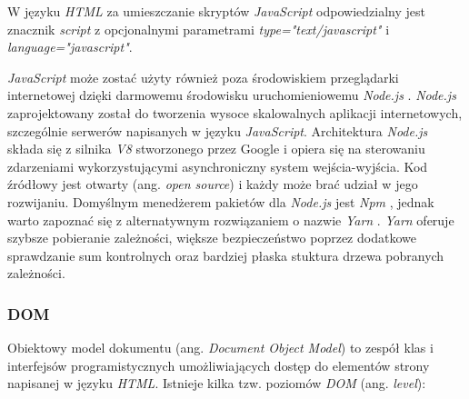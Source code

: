 \documentclass[polish, twoside, 12pt]{mwart}
\begin{document}
W języku \emph{HTML} za umieszczanie skryptów \emph{JavaScript} odpowiedzialny jest znacznik \emph{script} z opcjonalnymi parametrami \emph{type="text/javascript"} i \emph{language="javascript"}.

\emph{JavaScript} może zostać użyty również poza środowiskiem przeglądarki internetowej dzięki darmowemu środowisku uruchomieniowemu \emph{Node.js} \cite{node.js}. \emph{Node.js} zaprojektowany został do tworzenia wysoce skalowalnych aplikacji internetowych, szczególnie serwerów napisanych w języku \emph{JavaScript}. Architektura \emph{Node.js} składa się z silnika \emph{V8} \cite{v8} stworzonego przez Google i opiera się na sterowaniu zdarzeniami wykorzystującymi asynchroniczny system wejścia-wyjścia. Kod źródłowy jest otwarty (ang. \emph{open source}) i każdy może brać udział w jego rozwijaniu. Domyślnym menedżerem pakietów dla \emph{Node.js} jest \emph{Npm} \cite{npm}, jednak warto zapoznać się z alternatywnym rozwiązaniem o nazwie \emph{Yarn} \cite{yarn}. \emph{Yarn} oferuje szybsze pobieranie zależności, większe bezpieczeństwo poprzez dodatkowe sprawdzanie sum kontrolnych oraz bardziej płaska stuktura drzewa pobranych zależności.

\subsubsection{DOM} \label{dom}

Obiektowy model dokumentu (ang. \emph{Document Object Model}) to zespół klas i interfejsów programistycznych umożliwiających dostęp do elementów strony napisanej w języku \emph{HTML}. Istnieje kilka tzw. poziomów \emph{DOM} (ang. \emph{level}):
\end{document}
